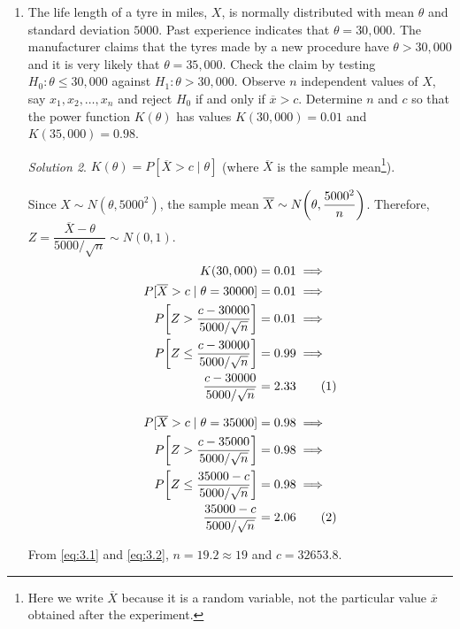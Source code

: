 \documentclass[svgnames, a5paper]{article}
\theoremstyle{definition}
\theoremstyle{remark}
\newtheorem*{Solution*}{Solution}
\begin{document}
\begin{enumerate}
\begin{Solution*}
$H_1$ is true when $\theta = 1$. Thus, the power of the test when $H_1$ is true is
\begin{align*}
K(1) = \dfrac 3 4 + \dfrac 1 4\log \dfrac 1 4 \approx 0.4. 
\end{align*}
\end{Solution*}

\item The life length of a tyre in miles, $X$, is normally distributed with mean $\theta$ and standard deviation $5000$. Past experience indicates that $\theta = 30,000$. The manufacturer claims that the tyres made by a new procedure have $\theta > 30,000$ and it is very likely that $\theta = 35,000$. Check the claim by testing $H_0 \colon \theta \le 30,000$ against $H_1 \colon \theta > 30,000$. Observe $n$ independent values of $X$, say $x_1, x_2, \ldots, x_n$ and reject $H_0$ if and only if $\overline x > c$. Determine $n$ and $c$ so that the power function $K(\theta)$ has values $K(30,000) = 0.01$ and $K(35,000) = 0.98$.
\begin{Solution*}
$K(\theta) = P[\overline X > c \mid \theta]$ (where $\overline X$ is the sample mean\footnote{
	Here we write $\overline X$ because it is a random variable, not the particular value $\overline x$ obtained after the experiment.
}).

Since $X \sim N(\theta, 5000^2)$, the sample mean $\overline X \sim N \pqty{\theta, \dfrac{5000^2}n}$. Therefore, $Z = \dfrac{\overline X - \theta}{5000/\sqrt n} \sim N(0, 1)$.
\begin{align*}
K(30,000) & = 0.01 \implies \\
P[\overline X > c \mid \theta = 30000]	& = 0.01 \implies \\
P\bqty{ Z > \dfrac{c - 30000}{5000/\sqrt n} } & = 0.01 \implies \\
P\bqty{ Z \le \dfrac{c - 30000}{5000/\sqrt n} } & = 0.99 \implies \\
\dfrac{c - 30000}{5000/\sqrt n} & = 2.33 \tag{1} \label{eq:3.1}
\end{align*}

\begin{align*}
P[\overline X > c \mid \theta = 35000] & = 0.98 \implies \\
P\bqty{ Z > \dfrac{c - 35000}{5000/\sqrt n} } & = 0.98 \implies \\
P\bqty{ Z \le \dfrac{35000 - c}{5000/\sqrt n} } & = 0.98 \implies \\
\dfrac{35000 - c}{5000/\sqrt n} & = 2.06 \tag{2} \label{eq:3.2}
\end{align*}

From \eqref{eq:3.1} and \eqref{eq:3.2}, $n = 19.2 \approx 19$ and $c = 32653.8$.
\end{Solution*}
\end{enumerate}
\end{document}
